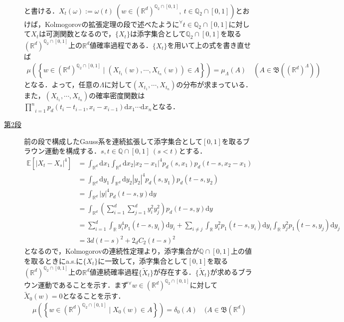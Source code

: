 \documentclass[dvipdfmx]{jsarticle}
\begin{document}
\begin{description}
\begin{align*}
\end{align*}
と書ける．$X_t(\omega):=\omega(t){\ }(w\in(\mathbb{R}^d)^{\mathbb{Q}_2\cap [0,1]},{\ }t\in\mathbb{Q}_2\cap [0,1])$とおけば，Kolmogorovの拡張定理の段で述べたように$^\forall t\in\mathbb{Q}_2\cap [0,1]$に対して$X_t$は可測関数となるので，$\{X_t\}$は添字集合として$\mathbb{Q}_2\cap [0,1]$を取る$(\mathbb{R}^d)^{\mathbb{Q}_2\cap [0,1]}$上の$\mathbb{R}^d$値確率過程である．$\{X_t\}$を用いて上の式を書き直せば
\begin{align*}
\mu\left(\left\{w\in (\mathbb{R}^d)^{\mathbb{Q}_2\cap [0,1]} \mid (X_{t_1}(w),\cdots,X_{t_n}(w))\in A\right\}\right)=\mu_\Lambda(A) \quad (A\in\mathfrak{B}((\mathbb{R}^d)^\Lambda))
\end{align*}
となる．よって，任意の$\Lambda$に対して$(X_{t_1},\cdots,X_{t_n})$の分布が求まっている．また，$(X_{t_1},\cdots,X_{t_n})$の確率密度関数は$\underset{i=1}{\overset{n}{\prod}} p_d(t_i-t_{i-1},x_i-x_{i-1})\mathrm{d}x_1\cdots\mathrm{d}x_n$となる．
\item[\underline{第2段}]
前の段で構成したGauss系を連続拡張して添字集合として$[0,1]$を取るブラウン運動を構成する．$s,t\in\mathbb{Q}\cap [0,1]{\ }(s<t)$とする．
\begin{align*}
\mathbb{E}[|X_t-X_s|^4]&=\int_{\mathbb{R}^d}\mathrm{d}x_1\int_{\mathbb{R}^d}\mathrm{d}x_2 |x_2-x_1|^4 p_d(s,x_1)p_d(t-s,x_2-x_1) \\
&=\int_{\mathbb{R}^d}\mathrm{d}y_1\int_{\mathbb{R}^d}\mathrm{d}y_2 |y_2|^4 p_d(s,y_1)p_d(t-s,y_2) \\
&=\int_{\mathbb{R}^d}|y|^4p_d(t-s,y)\mathrm{d}y \\
&=\int_{\mathbb{R}^d}\left(\sum_{i=1}^d\sum_{j=1}^d y_i^2y_j^2\right)p_d(t-s,y)\mathrm{d}y \\
&=\sum_{i=1}^d\int_{\mathbb{R}}y_i^4 p_1(t-s,y_i)\mathrm{d}y_i+\sum_{i\neq j}\int_{\mathbb{R}}y_i^2p_1(t-s,y_i)\mathrm{d}y_i\int_{\mathbb{R}}y_j^2p_1(t-s,y_j)\mathrm{d}y_j \\
&=3d(t-s)^2+2 _dC_2(t-s)^2
\end{align*}
となるので，Kolmogorovの連続性定理より，添字集合が$\mathbb{Q}\cap [0,1]$上の値を取るときにa.s.に$\{X_t\}$に一致して，添字集合として$[0,1]$を取る$(\mathbb{R}^d)^{\mathbb{Q}_2\cap [0,1]}$上の$\mathbb{R}^d$値連続確率過程$\{\widetilde{X}_t\}$が存在する．$\{\widetilde{X}_t\}$が求めるブラウン運動であることを示す．まず$^\forall w\in (\mathbb{R}^d)^{\mathbb{Q}_2\cap [0,1]}$に対して$\widetilde{X}_0(w)=0$となることを示す．
\begin{align*}
\mu\left(\left\{w\in (\mathbb{R}^d)^{\mathbb{Q}_2\cap [0,1]} \mid X_0(w)\in A\right\}\right)=\delta_0(A) \quad (A\in\mathfrak{B}(\mathbb{R}^d)

\end{align*}
\end{description}
\end{document}
